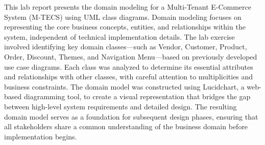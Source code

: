 This lab report presents the domain modeling for a Multi-Tenant E-Commerce System (M-TECS) using UML class diagrams. Domain modeling focuses on representing the core business concepts, entities, and relationships within the system, independent of technical implementation details. The lab exercise involved identifying key domain classes—such as Vendor, Customer, Product, Order, Discount, Themes, and Navigation Menu—based on previously developed use case diagrams. Each class was analyzed to determine its essential attributes and relationships with other classes, with careful attention to multiplicities and business constraints. The domain model was constructed using Lucidchart, a web-based diagramming tool, to create a visual representation that bridges the gap between high-level system requirements and detailed design. The resulting domain model serves as a foundation for subsequent design phases, ensuring that all stakeholders share a common understanding of the business domain before implementation begins.
\endinput
